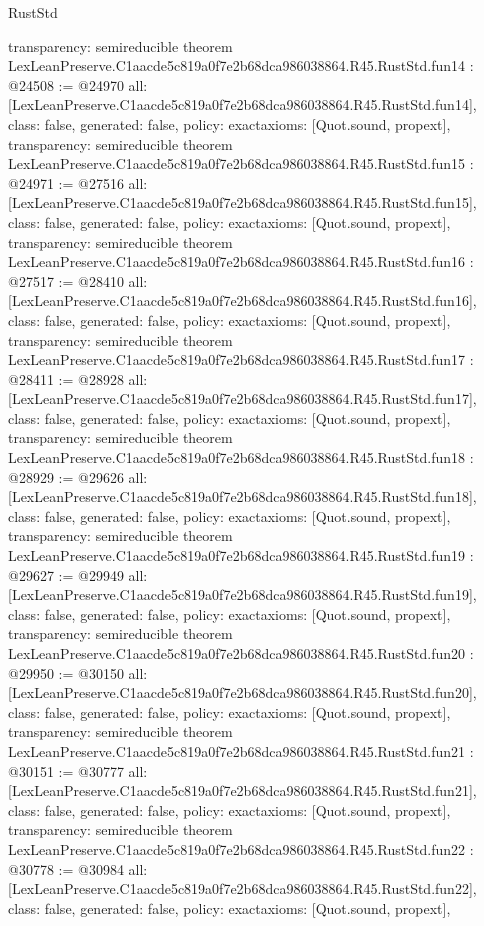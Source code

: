 \begin{lexlean}{RustStd}
\begin{coremodule}
{  transparency: semireducible
}
theorem LexLeanPreserve.C1aacde5c819a0f7e2b68dca986038864.R45.RustStd.fun14 : @24508 := @24970 {
  all: [LexLeanPreserve.C1aacde5c819a0f7e2b68dca986038864.R45.RustStd.fun14],
  class: false,
  generated: false,
  policy: exact{axioms: [Quot.sound, propext]},
  transparency: semireducible
}
theorem LexLeanPreserve.C1aacde5c819a0f7e2b68dca986038864.R45.RustStd.fun15 : @24971 := @27516 {
  all: [LexLeanPreserve.C1aacde5c819a0f7e2b68dca986038864.R45.RustStd.fun15],
  class: false,
  generated: false,
  policy: exact{axioms: [Quot.sound, propext]},
  transparency: semireducible
}
theorem LexLeanPreserve.C1aacde5c819a0f7e2b68dca986038864.R45.RustStd.fun16 : @27517 := @28410 {
  all: [LexLeanPreserve.C1aacde5c819a0f7e2b68dca986038864.R45.RustStd.fun16],
  class: false,
  generated: false,
  policy: exact{axioms: [Quot.sound, propext]},
  transparency: semireducible
}
theorem LexLeanPreserve.C1aacde5c819a0f7e2b68dca986038864.R45.RustStd.fun17 : @28411 := @28928 {
  all: [LexLeanPreserve.C1aacde5c819a0f7e2b68dca986038864.R45.RustStd.fun17],
  class: false,
  generated: false,
  policy: exact{axioms: [Quot.sound, propext]},
  transparency: semireducible
}
theorem LexLeanPreserve.C1aacde5c819a0f7e2b68dca986038864.R45.RustStd.fun18 : @28929 := @29626 {
  all: [LexLeanPreserve.C1aacde5c819a0f7e2b68dca986038864.R45.RustStd.fun18],
  class: false,
  generated: false,
  policy: exact{axioms: [Quot.sound, propext]},
  transparency: semireducible
}
theorem LexLeanPreserve.C1aacde5c819a0f7e2b68dca986038864.R45.RustStd.fun19 : @29627 := @29949 {
  all: [LexLeanPreserve.C1aacde5c819a0f7e2b68dca986038864.R45.RustStd.fun19],
  class: false,
  generated: false,
  policy: exact{axioms: [Quot.sound, propext]},
  transparency: semireducible
}
theorem LexLeanPreserve.C1aacde5c819a0f7e2b68dca986038864.R45.RustStd.fun20 : @29950 := @30150 {
  all: [LexLeanPreserve.C1aacde5c819a0f7e2b68dca986038864.R45.RustStd.fun20],
  class: false,
  generated: false,
  policy: exact{axioms: [Quot.sound, propext]},
  transparency: semireducible
}
theorem LexLeanPreserve.C1aacde5c819a0f7e2b68dca986038864.R45.RustStd.fun21 : @30151 := @30777 {
  all: [LexLeanPreserve.C1aacde5c819a0f7e2b68dca986038864.R45.RustStd.fun21],
  class: false,
  generated: false,
  policy: exact{axioms: [Quot.sound, propext]},
  transparency: semireducible
}
theorem LexLeanPreserve.C1aacde5c819a0f7e2b68dca986038864.R45.RustStd.fun22 : @30778 := @30984 {
  all: [LexLeanPreserve.C1aacde5c819a0f7e2b68dca986038864.R45.RustStd.fun22],
  class: false,
  generated: false,
  policy: exact{axioms: [Quot.sound, propext]},
}
\end{coremodule}
\end{lexlean}
